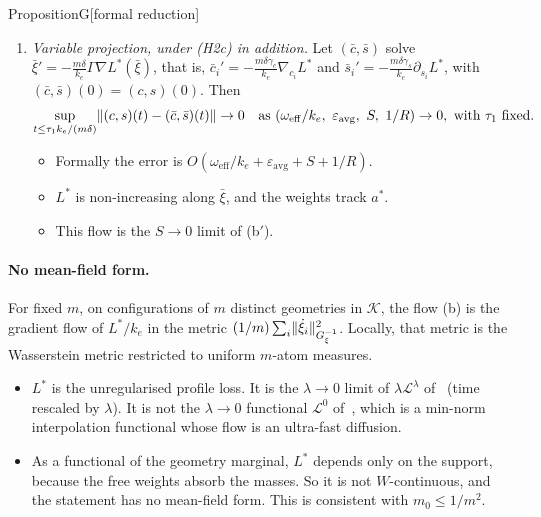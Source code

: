 \begin{thm}{Proposition}{G}[formal reduction]
\begin{enumerate}[label=(\alph*),leftmargin=2.2em]
  \item[\textup{(b)}] \emph{Variable projection, under \textup{(H2c)} in addition.} Let $(\bar c,\bar s)$ solve
    $\bar\xi' = -\frac{m\delta}{k_e}\Gamma\nabla L^*(\bar\xi)$, that is,
    $\bar c_i' = -\frac{m\delta\gamma_c}{k_e}\nabla_{c_i}L^*$ and
    $\bar s_i' = -\frac{m\delta\gamma_s}{k_e}\partial_{s_i}L^*$, with $(\bar c,\bar s)(0) = (c,s)(0)$. Then
    \begin{equation}\label{eq:propG:varpro}
      \sup_{t\le\tau_1k_e/(m\delta)}\norm{(c,s)(t) - (\bar c,\bar s)(t)} \to 0
      \quad\text{as } (\omega_{\mathrm{eff}}/k_e,\ \varepsilon_{\mathrm{avg}},\ S,\ 1/R)\to0,
      \text{ with } \tau_1 \text{ fixed.}
    \end{equation}
    \begin{itemize}
      \item Formally the error is $O(\omega_{\mathrm{eff}}/k_e + \varepsilon_{\mathrm{avg}} + S + 1/R)$.
      \item $L^*$ is non-increasing along $\bar\xi$, and the weights track $a^*$.
      \item This flow is the $S\to0$ limit of (b$'$).
    \end{itemize}
\end{enumerate}
\end{thm}

\paragraph{No mean-field form.} For fixed $m$, on configurations of $m$ distinct geometries in $\mathcal{K}$, the flow
(b) is the gradient flow of $L^*/k_e$ in the metric $(1/m)\sum_i\lVert \dot\xi_i\rVert^2_{G_\xi^{-1}}$. Locally, that metric
is the Wasserstein metric restricted to uniform $m$-atom measures.
\begin{itemize}
  \item $L^*$ is the unregularised profile loss. It is the $\lambda\to0$ limit of $\lambda\mathcal{L}^\lambda$
    of~\cite{S2} (time rescaled by $\lambda$). It is not the $\lambda\to0$ functional $\mathcal{L}^0$ of~\cite{S2},
    which is a min-norm interpolation functional whose flow is an ultra-fast diffusion.
  \item As a functional of the geometry marginal, $L^*$ depends only on the support, because the free weights absorb
    the masses. So it is not $W$-continuous, and the statement has no mean-field form. This is consistent with
    $m_0 \le 1/m^2$.
\end{itemize}

